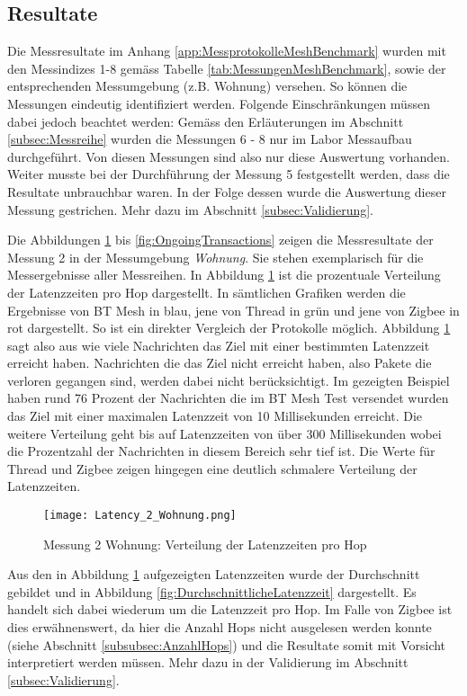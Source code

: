 \subsection{Resultate}\label{subsec:Resultate}
Die Messresultate im Anhang \ref{app:MessprotokolleMeshBenchmark} wurden mit den Messindizes 1-8 gemäss Tabelle \ref{tab:MessungenMeshBenchmark}, sowie der entsprechenden Messumgebung (z.B. Wohnung) versehen.
So können die Messungen eindeutig identifiziert werden.
Folgende Einschränkungen müssen dabei jedoch beachtet werden:
Gemäss den Erläuterungen im Abschnitt \ref{subsec:Messreihe} wurden die Messungen 6 - 8 nur im Labor Messaufbau durchgeführt. Von diesen Messungen sind also nur diese Auswertung vorhanden.
Weiter musste bei der Durchführung der Messung 5 festgestellt werden, dass die Resultate unbrauchbar waren.
In der Folge dessen wurde die Auswertung dieser Messung gestrichen. Mehr dazu im Abschnitt  \ref{subsec:Validierung}.


Die Abbildungen \ref{fig:VerteilungderLatenzzeiten} bis \ref{fig:OngoingTransactions} zeigen die Messresultate der Messung 2 in der Messumgebung \textit{Wohnung}. Sie stehen exemplarisch für die Messergebnisse aller Messreihen.
In Abbildung \ref{fig:VerteilungderLatenzzeiten} ist die prozentuale Verteilung der Latenzzeiten pro Hop dargestellt.
In sämtlichen Grafiken werden die Ergebnisse von BT Mesh in blau, jene von Thread in grün und jene von Zigbee in rot dargestellt.
So ist ein direkter Vergleich der Protokolle möglich.
Abbildung \ref{fig:VerteilungderLatenzzeiten} sagt also aus wie viele Nachrichten das Ziel mit einer bestimmten Latenzzeit erreicht haben.
Nachrichten die das Ziel nicht erreicht haben, also Pakete die verloren gegangen sind, werden dabei nicht berücksichtigt.
Im gezeigten Beispiel haben rund 76 Prozent der Nachrichten die im BT Mesh Test versendet wurden das Ziel mit einer maximalen Latenzzeit von 10 Millisekunden erreicht.
Die weitere Verteilung geht bis auf Latenzzeiten von über 300 Millisekunden wobei die Prozentzahl der Nachrichten in diesem Bereich sehr tief ist.
Die Werte für Thread und Zigbee zeigen hingegen eine deutlich schmalere Verteilung der Latenzzeiten.

\begin{figure}[h]
	\centering
	\texttt{[image: Latency\_2\_Wohnung.png]}
	\caption{Messung 2 Wohnung: Verteilung der Latenzzeiten pro Hop}
	\label{fig:VerteilungderLatenzzeiten}
\end{figure}

Aus den in Abbildung \ref{fig:VerteilungderLatenzzeiten} aufgezeigten Latenzzeiten wurde der Durchschnitt gebildet und in Abbildung \ref{fig:DurchschnittlicheLatenzzeit} dargestellt.
Es handelt sich dabei wiederum um die Latenzzeit pro Hop. Im Falle von Zigbee ist dies erwähnenswert, da hier die Anzahl Hops nicht ausgelesen werden konnte (siehe Abschnitt \ref{subsubsec:AnzahlHops}) und die Resultate somit mit Vorsicht interpretiert werden müssen. Mehr dazu in der Validierung im Abschnitt \ref{subsec:Validierung}.

